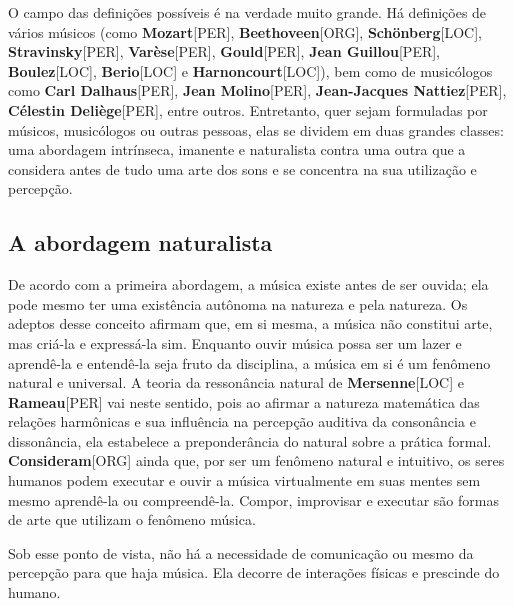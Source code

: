 \documentclass[a4paper,12pt]{article}
\begin{document}
O campo das definições possíveis é na verdade muito grande. Há definições de vários músicos (como \textbf{Mozart}\textsc{[PER]}, \textbf{Beethoveen}\textsc{[ORG]}, \textbf{Schönberg}\textsc{[LOC]}, \textbf{Stravinsky}\textsc{[PER]}, \textbf{Varèse}\textsc{[PER]}, \textbf{Gould}\textsc{[PER]}, \textbf{Jean Guillou}\textsc{[PER]}, \textbf{Boulez}\textsc{[LOC]}, \textbf{Berio}\textsc{[LOC]} e \textbf{Harnoncourt}\textsc{[LOC]}), bem como de musicólogos como \textbf{Carl Dalhaus}\textsc{[PER]}, \textbf{Jean Molino}\textsc{[PER]}, \textbf{Jean-Jacques Nattiez}\textsc{[PER]}, \textbf{Célestin Deliège}\textsc{[PER]}, entre outros. Entretanto, quer sejam formuladas por músicos, musicólogos ou outras pessoas, elas se dividem em duas grandes classes: uma abordagem intrínseca, imanente e naturalista contra uma outra que a considera antes de tudo uma arte dos sons e se concentra na sua utilização e percepção.

\subsection*{A abordagem naturalista}
De acordo com a primeira abordagem, a música existe antes de ser ouvida; ela pode mesmo ter uma existência autônoma na natureza e pela natureza. Os adeptos desse conceito afirmam que, em si mesma, a música não constitui arte, mas criá-la e expressá-la sim. Enquanto ouvir música possa ser um lazer e aprendê-la e entendê-la seja fruto da disciplina, a música em si é um fenômeno natural e universal. A teoria da ressonância natural de \textbf{Mersenne}\textsc{[LOC]} e \textbf{Rameau}\textsc{[PER]} vai neste sentido, pois ao afirmar a natureza matemática das relações harmônicas e sua influência na percepção auditiva da consonância e dissonância, ela estabelece a preponderância do natural sobre a prática formal. \textbf{Consideram}\textsc{[ORG]} ainda que, por ser um fenômeno natural e intuitivo, os seres humanos podem executar e ouvir a música virtualmente em suas mentes sem mesmo aprendê-la ou compreendê-la. Compor, improvisar e executar são formas de arte que utilizam o fenômeno música.

Sob esse ponto de vista, não há a necessidade de comunicação ou mesmo da percepção para que haja música. Ela decorre de interações físicas e prescinde do humano.
\end{document}
